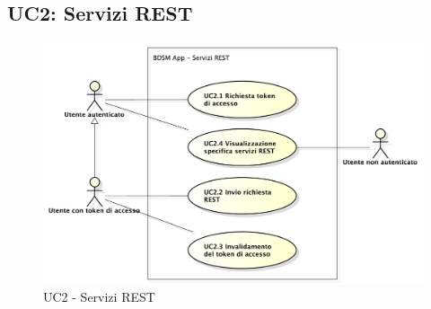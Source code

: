 \pagebreak



\subsection{UC2: Servizi REST}
\begin{figure}[htbp]
	\centering
	\centerline{\includegraphics[scale=0.50]{./images/UC2.pdf}}
	\caption{UC2 - Servizi REST}
\end{figure}

